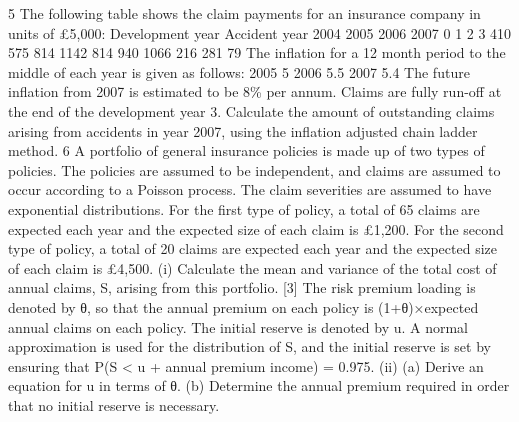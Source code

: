 \documentclass[a4paper,12pt]{article}
\begin{document}
5
The following table shows the claim payments for an insurance company in units of
£5,000:
Development year
Accident
year
2004
2005
2006
2007
0 1 2 3
410
575
814
1142 814
940
1066 216
281 79
The inflation for a 12 month period to the middle of each year is given as follows:
2005
5%
2006
5.5%
2007
5.4%
The future inflation from 2007 is estimated to be 8\% per annum.
Claims are fully run-off at the end of the development year 3.
Calculate the amount of outstanding claims arising from accidents in year 2007, using the inflation adjusted chain ladder method.
6
A portfolio of general insurance policies is made up of two types of policies. The policies are assumed to be independent, and claims are assumed to occur according to a Poisson process. The claim severities are assumed to have exponential distributions.
For the first type of policy, a total of 65 claims are expected each year and the expected size of each claim is £1,200.
For the second type of policy, a total of 20 claims are expected each year and the expected size of each claim is £4,500.
(i)
Calculate the mean and variance of the total cost of annual claims, S, arising from this portfolio.
[3]
The risk premium loading is denoted by θ, so that the annual premium on each policy is (1+θ)×expected annual claims on each policy. The initial reserve is denoted by u.
A normal approximation is used for the distribution of S, and the initial reserve is set by ensuring that
P(S < u + annual premium income) = 0.975.
(ii)
(a) Derive an equation for u in terms of θ.
(b) Determine the annual premium required in order that no initial reserve
is necessary.
\end{document}

